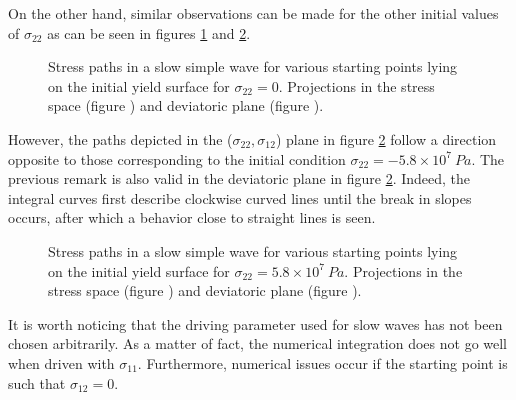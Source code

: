 On the other hand, similar observations can be made for the other initial values of $\sigma_{22}$ as can be seen in figures \ref{fig:slow_path_plane_stress2} and \ref{fig:slow_path_plane_stress3}.
\begin{figure}[h!]
  \centering
  \caption{Stress paths in a slow simple wave for various starting points lying on the initial yield surface for $\sigma_{22}=0$. Projections in the stress space (figure ) and deviatoric plane (figure ).}
  \label{fig:slow_path_plane_stress2}
\end{figure}
However, the paths depicted in the ($\sigma_{22},\sigma_{12}$) plane in figure \ref{fig:slow_path_plane_stress3} follow a direction opposite to those corresponding to the initial condition $\sigma_{22}=-5.8\times 10^7 \: Pa$.
The previous remark is also valid in the deviatoric plane in figure \ref{fig:slow_path_plane_stress3}.
Indeed, the integral curves first describe clockwise curved lines until the break in slopes occurs, after which a behavior close to straight lines is seen.
\begin{figure}[h!]
  \centering
  \caption{Stress paths in a slow simple wave for various starting points lying on the initial yield surface for $\sigma_{22}=5.8\times 10^7 \: Pa$. Projections in the stress space (figure ) and deviatoric plane (figure ).}
  \label{fig:slow_path_plane_stress3}
\end{figure}
It is worth noticing that the driving parameter used for slow waves has not been chosen arbitrarily.
As a matter of fact, the numerical integration does not go well when driven with $\sigma_{11}$.
Furthermore, numerical issues occur if the starting point is such that $\sigma_{12}=0$.

